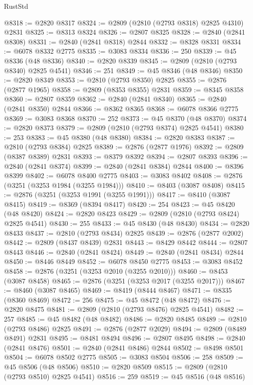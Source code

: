 \begin{lexlean}{RustStd}
\begin{coremodule}
@8318 := @2820 @8317
@8324 := @2809 (@2810 (@2793 @8318) @2825 @4310) @2831
@8325 := @8313 @8324
@8326 := @2807 @8325
@8328 := @2840 (@2841 @8308)
@8331 := @2840 (@2841 @8318) @2844
@8332 := @8328 @8331
@8334 := @6078 @8332 @2775
@8335 := @3083 @8334
@8336 := 250
@8339 := @45 @8336 (@48 @8336)
@8340 := @2820 @8339
@8345 := @2809 (@2810 (@2793 @8340) @2825 @4541)
@8346 := 251
@8349 := @45 @8346 (@48 @8346)
@8350 := @2820 @8349
@8353 := @2810 (@2793 @8350) @2825
@8355 := @2876 (@2877 @1965)
@8358 := @2809 (@8353 @8355) @2831
@8359 := @8345 @8358
@8360 := @2807 @8359
@8362 := @2840 (@2841 @8340)
@8365 := @2840 (@2841 @8350) @2844
@8366 := @8362 @8365
@8368 := @6078 @8366 @2775
@8369 := @3083 @8368
@8370 := 252
@8373 := @45 @8370 (@48 @8370)
@8374 := @2820 @8373
@8379 := @2809 (@2810 (@2793 @8374) @2825 @4541)
@8380 := 253
@8383 := @45 @8380 (@48 @8380)
@8384 := @2820 @8383
@8387 := @2810 (@2793 @8384) @2825
@8389 := @2876 (@2877 @1976)
@8392 := @2809 (@8387 @8389) @2831
@8393 := @8379 @8392
@8394 := @2807 @8393
@8396 := @2840 (@2841 @8374)
@8399 := @2840 (@2841 @8384) @2844
@8400 := @8396 @8399
@8402 := @6078 @8400 @2775
@8403 := @3083 @8402
@8408 := @2876 (@3251 (@3253 @1984 (@3255 @1984)))
@8410 := @8403 (@3087 @8408)
@8415 := @2876 (@3251 (@3253 @1991 (@3255 @1991)))
@8417 := @8410 (@3087 @8415)
@8419 := @8369 (@8394 @8417)
@8420 := 254
@8423 := @45 @8420 (@48 @8420)
@8424 := @2820 @8423
@8429 := @2809 (@2810 (@2793 @8424) @2825 @4541)
@8430 := 255
@8433 := @45 @8430 (@48 @8430)
@8434 := @2820 @8433
@8437 := @2810 (@2793 @8434) @2825
@8439 := @2876 (@2877 @2002)
@8442 := @2809 (@8437 @8439) @2831
@8443 := @8429 @8442
@8444 := @2807 @8443
@8446 := @2840 (@2841 @8424)
@8449 := @2840 (@2841 @8434) @2844
@8450 := @8446 @8449
@8452 := @6078 @8450 @2775
@8453 := @3083 @8452
@8458 := @2876 (@3251 (@3253 @2010 (@3255 @2010)))
@8460 := @8453 (@3087 @8458)
@8465 := @2876 (@3251 (@3253 @2017 (@3255 @2017)))
@8467 := @8460 (@3087 @8465)
@8469 := @8419 (@8444 @8467)
@8471 := @8335 (@8360 @8469)
@8472 := 256
@8475 := @45 @8472 (@48 @8472)
@8476 := @2820 @8475
@8481 := @2809 (@2810 (@2793 @8476) @2825 @4541)
@8482 := 257
@8485 := @45 @8482 (@48 @8482)
@8486 := @2820 @8485
@8489 := @2810 (@2793 @8486) @2825
@8491 := @2876 (@2877 @2029)
@8494 := @2809 (@8489 @8491) @2831
@8495 := @8481 @8494
@8496 := @2807 @8495
@8498 := @2840 (@2841 @8476)
@8501 := @2840 (@2841 @8486) @2844
@8502 := @8498 @8501
@8504 := @6078 @8502 @2775
@8505 := @3083 @8504
@8506 := 258
@8509 := @45 @8506 (@48 @8506)
@8510 := @2820 @8509
@8515 := @2809 (@2810 (@2793 @8510) @2825 @4541)
@8516 := 259
@8519 := @45 @8516 (@48 @8516)

\end{coremodule}
\end{lexlean}

